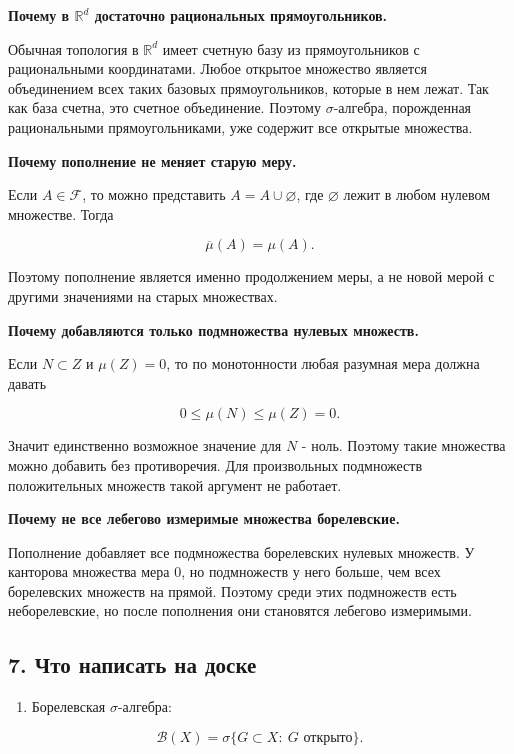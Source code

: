 \documentclass[
  11pt,
  a4paper,
]{article}
\providecommand{\tightlist}{%
  \setlength{\itemsep}{0pt}\setlength{\parskip}{0pt}}
\begin{document}
\textbf{Почему в \(\mathbb R^d\) достаточно рациональных
прямоугольников.}

Обычная топология в \(\mathbb R^d\) имеет счетную базу из
прямоугольников с рациональными координатами. Любое открытое множество
является объединением всех таких базовых прямоугольников, которые в нем
лежат. Так как база счетна, это счетное объединение. Поэтому
\(\sigma\)-алгебра, порожденная рациональными прямоугольниками, уже
содержит все открытые множества.

\textbf{Почему пополнение не меняет старую меру.}

Если \(A\in\mathcal F\), то можно представить \(A=A\cup\varnothing\),
где \(\varnothing\) лежит в любом нулевом множестве. Тогда

\[
\overline{\mu}(A)=\mu(A).
\]

Поэтому пополнение является именно продолжением меры, а не новой мерой с
другими значениями на старых множествах.

\textbf{Почему добавляются только подмножества нулевых множеств.}

Если \(N\subset Z\) и \(\mu(Z)=0\), то по монотонности любая разумная
мера должна давать

\[
0\le\mu(N)\le\mu(Z)=0.
\]

Значит единственно возможное значение для \(N\) - ноль. Поэтому такие
множества можно добавить без противоречия. Для произвольных подмножеств
положительных множеств такой аргумент не работает.

\textbf{Почему не все лебегово измеримые множества борелевские.}

Пополнение добавляет все подмножества борелевских нулевых множеств. У
канторова множества мера \(0\), но подмножеств у него больше, чем всех
борелевских множеств на прямой. Поэтому среди этих подмножеств есть
неборелевские, но после пополнения они становятся лебегово измеримыми.

\subsection{7. Что написать на
доске}\label{ux447ux442ux43e-ux43dux430ux43fux438ux441ux430ux442ux44c-ux43dux430-ux434ux43eux441ux43aux435}

\begin{enumerate}
\def\labelenumi{\arabic{enumi}.}
\tightlist
\item
  Борелевская \(\sigma\)-алгебра:
\end{enumerate}

\[
\mathcal B(X)=\sigma\{G\subset X:\ G\text{ открыто}\}.
\]
\end{document}
